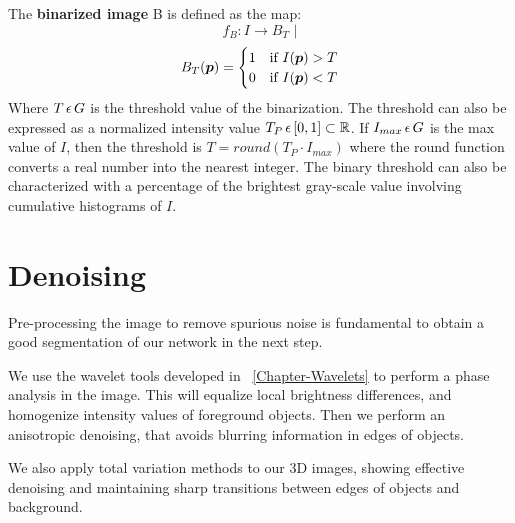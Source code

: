 The \textbf{binarized image} B is defined as the map:
$$f_B: I \longrightarrow B_T \,\,|$$ 
\begin{equation}
 B_T(\boldsymbol{p})=
   \begin{cases} 
     1               & \mbox{if } I(\boldsymbol{p}) > T   \\
     0               & \mbox{if } I(\boldsymbol{p}) < T
   \end{cases}
   \label{eq:bin}
\end{equation}
Where $T\,\epsilon \,{}G$ is the threshold value of the binarization. The threshold can also be expressed as
a normalized intensity value $T_P \,\epsilon \,{}[0,1]\subset \mathbb{R}$. If
$I_{max}\,\epsilon \,{}G$ is the max value of $I$, then the threshold  is
$T=round(T_P \cdot I_{max})$  where the round function converts a real number
into the nearest integer. The binary threshold can also be characterized with a percentage of the
brightest gray-scale value involving
cumulative histograms of $I$.

\section{Denoising}%
\label{sec:denoising}

Pre-processing the image to remove spurious noise is fundamental to obtain a good segmentation of our network in the next step.

We use the wavelet tools developed in ~\autoref{Chapter-Wavelets} to perform a phase analysis \cite{held_steerable_2010} in the image. This will equalize local brightness differences, and homogenize intensity values of foreground objects. Then we perform an anisotropic denoising, that avoids blurring information in edges of objects.

We also apply total variation \cite{barbero_fast_2011, barbero_modular_2014} methods to our 3D images, showing effective denoising and maintaining sharp transitions between edges of objects and background.

